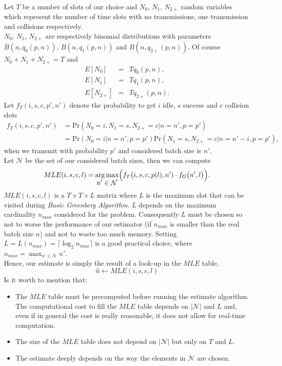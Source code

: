 \documentclass[11pt,a4paper,twoside,openright]{book}
\DeclareMathOperator*{\argmax}{arg\,max}
\DeclareMathOperator*{\mymax}{max}
\newcommand{\fg}{f_{G}}
\begin{document}
 Let $T$ be a number of slots of our choice and $N_{0}$, $N_{1}$, $N_{2+}$ random variables which represent the number of time slots with no transmissions, one transmission and collisions respectively.\\
 $N_{0}$, $N_{1}$, $N_{2+}$ are respectively binomial distributions with parameters $B(n,q_{0}(p,n))$, $B(n,q_{1}(p,n))$ and $B(n,q_{2+}(p,n))$. Of course $N_{0}+N_{1}+N_{2+}=T$ and
 \begin{eqnarray*}
E[N_{0}] &=& Tq_{0}(p,n),\\
E[N_{1}] &=& Tq_{1}(p,n),\\
E[N_{2+}] &=& Tq_{2+}(p,n).
\end{eqnarray*}
Let $f_{T}(i,s,c,p',n')$ denote the probability to get $i$ idle, $s$ success and
 $c$ collision slots \begin{align}
f_{T}(i,s,c,p',n')&= \textrm{Pr}(N_{0}=i,N_{1}=s,N_{2+}=c|n=n',p=p')\\
\nonumber
 &=\textrm{Pr}(N_{0}=i|n=n',p=p')\textrm{Pr}(N_{1}=s,N_{2+}=c|n=n'-i,p=p'),
\end{align}
when we transmit with probability $p'$ and considered batch size is $n'$.\\
Let $\mathcal{N}$ be the set of our considered batch sizes, then we can compute
\begin{equation}
MLE(i,s,c,l)=\argmax_{\displaystyle{n' \in \mathcal{N}}} \Bigl( f_{T}\bigl(i,s,c,p(l),n')\cdot \fg\bigl(n',l\bigr)\Bigr).
\label{eq:MLEiscl}
\end{equation}
$MLE(i,s,c,l)$ is a $T \times T \times L$ matrix where $L$ is the maximum slot that can be visited during \emph{Basic Greenberg Algorithm}. $L$ depends on the maximum cardinality  $n_{max}$ considered for the problem. Consequently  $L$ must be chosen so not to worse the performance of our estimator (if $n_{max}$ is smaller than the real batch size $n$) and not to waste too much memory. Setting $L= L(n_{max}) = \lceil\log_{2}n_{max}\rceil$ is a good practical choice, where $\displaystyle n_{max}= \mymax_{n' \in \mathcal{N}}{n'}$.\\
Hence, our estimate is simply the result of a look-up in the $MLE$ table,
\begin{equation}
\hat{n} \longleftarrow MLE(i,s,c,l)
\end{equation}
Is it worth to mention that:
\begin{itemize}
\item  The $MLE$ table must be precomputed before running the estimate algorithm. The computational cost to fill the $MLE$ table depends on $|\mathcal{N}|$ and $L$ and, even if in general the cost is really reasonable, it does not allow for real-time computation.
\item The size of the $MLE$ table does not depend on $|\mathcal{N}|$ but only on $T$ and $L$.
\item The estimate deeply depends on the way the elements in $\mathcal{N}$ are chosen. \\
\end{itemize}
\end{document}
